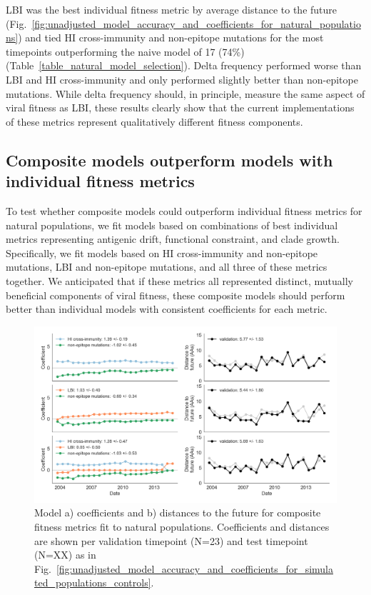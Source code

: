 LBI was the best individual fitness metric by average distance to the future (Fig.~\ref{fig:unadjusted_model_accuracy_and_coefficients_for_natural_populations}) and tied HI cross-immunity and non-epitope mutations for the most timepoints outperforming the naive model of 17 (74\%) (Table~\ref{table_natural_model_selection}).
Delta frequency performed worse than LBI and HI cross-immunity and only performed slightly better than non-epitope mutations.
While delta frequency should, in principle, measure the same aspect of viral fitness as LBI, these results clearly show that the current implementations of these metrics represent qualitatively different fitness components.

\subsection*{Composite models outperform models with individual fitness metrics}

To test whether composite models could outperform individual fitness metrics for natural populations, we fit models based on combinations of best individual metrics representing antigenic drift, functional constraint, and clade growth.
Specifically, we fit models based on HI cross-immunity and non-epitope mutations, LBI and non-epitope mutations, and all three of these metrics together.
We anticipated that if these metrics all represented distinct, mutually beneficial components of viral fitness, these composite models should perform better than individual models with consistent coefficients for each metric.

\begin{figure}[ht]
  \begin{center}
  \includegraphics[width=\textwidth]{figures/best-composite-unadjusted-model-accuracy-and-coefficients-for-natural-populations.png}
  \caption{
    Model a) coefficients and b) distances to the future for composite fitness metrics fit to natural populations.
    Coefficients and distances are shown per validation timepoint (N=23) and test timepoint (N=XX) as in Fig.~\ref{fig:unadjusted_model_accuracy_and_coefficients_for_simulated_populations_controls}.
  }
  \label{fig:unadjusted_composite_model_accuracy_and_coefficients_for_natural_populations}
  \end{center}
\end{figure}


